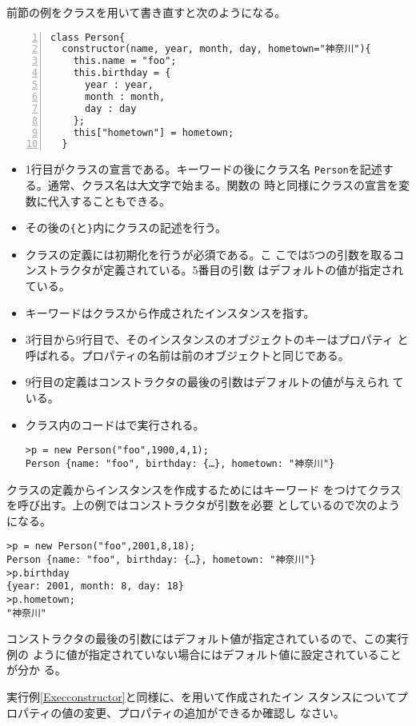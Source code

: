 前節の例をクラスを用いて書き直すと次のようになる。
\begin{Verbatim}[numbers=left]
class Person{
  constructor(name, year, month, day, hometown="神奈川"){
    this.name = "foo";
    this.birthday = {
      year : year,
      month : month,
      day : day
    };
    this["hometown"] = hometown;
  }
\end{Verbatim}
\begin{itemize}
 \item 1行目がクラスの宣言である。キーワードの後にクラス名
       \texttt{Person}を記述する。通常、クラス名は大文字で始まる。関数の
       時と同様にクラスの宣言を変数に代入することもできる。
 \item その後の\Verb+{+と\Verb+}+内にクラスの記述を行う。
 \item クラスの定義には初期化を行うが必須である。こ
       こでは5つの引数を取るコンストラクタが定義されている。5番目の引数
       はデフォルトの値が指定されている。
 \item キーワードはクラスから作成されたインスタンスを指す。
 \item 3行目から9行目で、そのインスタンスのオブジェクトのキーはプロパティ
			 と呼ばれる。プロパティの名前は前のオブジェクトと同じである。
 \item 9行目の定義はコンストラクタの最後の引数はデフォルトの値が与えられ
			 ている。
 \item クラス内のコードは\Strict で実行される。
\begin{Verbatim}
>p = new Person("foo",1900,4,1);
Person {name: "foo", birthday: {…}, hometown: "神奈川"}
\end{Verbatim}
\end{itemize}
クラスの定義からインスタンスを作成するためにはキーワード
をつけてクラスを呼び出す。上の例ではコンストラクタが引数を必要
としているので次のようになる。
\begin{Verbatim}
>p = new Person("foo",2001,8,18);
Person {name: "foo", birthday: {…}, hometown: "神奈川"}
>p.birthday
{year: 2001, month: 8, day: 18}
>p.hometown;
"神奈川"
\end{Verbatim}
コンストラクタの最後の引数にはデフォルト値が指定されているので、この実行例の
ように値が指定されていない場合にはデフォルト値に設定されていることが分か
る。
\begin{Prob}\upshape
実行例\ref{Execconstructor}と同様に、を用いて作成されたイン
 スタンスについてプロパティの値の変更、プロパティの追加ができるか確認し
 なさい。
\end{Prob}
